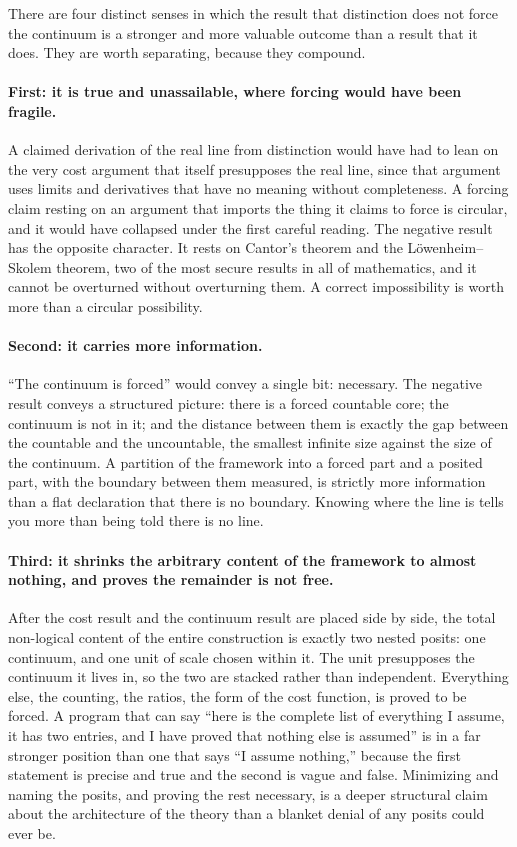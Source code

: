 \documentclass[11pt,a4paper]{article}
\theoremstyle{definition}
\theoremstyle{remark}
\begin{document}
There are four distinct senses in which the result that distinction does not
force the continuum is a stronger and more valuable outcome than a result that it
does. They are worth separating, because they compound.

\paragraph{First: it is true and unassailable, where forcing would have been
fragile.} A claimed derivation of the real line from distinction would have had
to lean on the very cost argument that itself presupposes the real line, since
that argument uses limits and derivatives that have no meaning without
completeness. A forcing claim resting on an argument that imports the thing it
claims to force is circular, and it would have collapsed under the first careful
reading. The negative result has the opposite character. It rests on Cantor's
theorem and the L\"owenheim--Skolem theorem, two of the most secure results in
all of mathematics, and it cannot be overturned without overturning them. A
correct impossibility is worth more than a circular possibility.

\paragraph{Second: it carries more information.} ``The continuum is forced''
would convey a single bit: necessary. The negative result conveys a structured
picture: there is a forced countable core; the continuum is not in it; and the
distance between them is exactly the gap between the countable and the
uncountable, the smallest infinite size against the size of the continuum. A
partition of the framework into a forced part and a posited part, with the
boundary between them measured, is strictly more information than a flat
declaration that there is no boundary. Knowing where the line is tells you more
than being told there is no line.

\paragraph{Third: it shrinks the arbitrary content of the framework to almost
nothing, and proves the remainder is not free.} After the cost result and the
continuum result are placed side by side, the total non-logical content of the
entire construction is exactly two nested posits: one continuum, and one unit of
scale chosen within it. The unit presupposes the continuum it lives in, so the
two are stacked rather than independent. Everything else, the counting, the
ratios, the form of the cost function, is proved to be forced. A program that
can say ``here is the complete list of everything I assume, it has two entries,
and I have proved that nothing else is assumed'' is in a far stronger position
than one that says ``I assume nothing,'' because the first statement is precise
and true and the second is vague and false. Minimizing and naming the posits, and
proving the rest necessary, is a deeper structural claim about the architecture
of the theory than a blanket denial of any posits could ever be.
\end{document}
